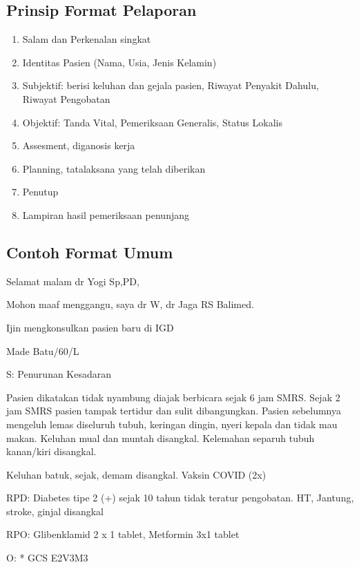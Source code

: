 \documentclass[
]{book}
\providecommand{\tightlist}{%
  \setlength{\itemsep}{0pt}\setlength{\parskip}{0pt}}
\begin{document}
\hypertarget{prinsip-format-pelaporan}{%
\subsection{Prinsip Format Pelaporan}\label{prinsip-format-pelaporan}}

\begin{enumerate}
\def\labelenumi{\arabic{enumi}.}
\tightlist
\item
  Salam dan Perkenalan singkat
\item
  Identitas Pasien (Nama, Usia, Jenis Kelamin)
\item
  Subjektif: berisi keluhan dan gejala pasien, Riwayat Penyakit Dahulu, Riwayat Pengobatan
\item
  Objektif: Tanda Vital, Pemeriksaan Generalis, Status Lokalis
\item
  Assesment, diganosis kerja
\item
  Planning, tatalaksana yang telah diberikan
\item
  Penutup
\item
  Lampiran hasil pemeriksaan penunjang
\end{enumerate}

\hypertarget{contoh-format-umum}{%
\subsection{Contoh Format Umum}\label{contoh-format-umum}}

Selamat malam dr Yogi Sp,PD,

Mohon maaf menggangu, saya dr W, dr Jaga RS Balimed.

Ijin mengkonsulkan pasien baru di IGD

Made Batu/60/L

S: Penurunan Kesadaran

Pasien dikatakan tidak nyambung diajak berbicara sejak 6 jam SMRS. Sejak 2 jam SMRS pasien tampak tertidur dan sulit dibangungkan. Pasien sebelumnya mengeluh lemas diseluruh tubuh, keringan dingin, nyeri kepala dan tidak mau makan. Keluhan mual dan muntah disangkal. Kelemahan separuh tubuh kanan/kiri disangkal.

Keluhan batuk, sejak, demam disangkal. Vaksin COVID (2x)

RPD:
Diabetes tipe 2 (+) sejak 10 tahun tidak teratur pengobatan. HT, Jantung, stroke, ginjal disangkal

RPO:
Glibenklamid 2 x 1 tablet, Metformin 3x1 tablet

O:
* GCS E2V3M3
\end{document}
